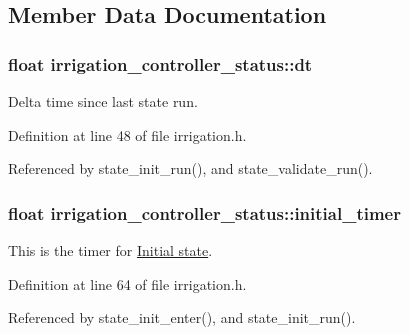 \subsection{Member Data Documentation}
\hypertarget{structirrigation__controller__status_a0a4447a8aa2200bacf97bd7e844493c1}{}
\subsubsection[{dt}]{\setlength{\rightskip}{0pt plus 5cm}float irrigation\+\_\+controller\+\_\+status\+::dt}\label{structirrigation__controller__status_a0a4447a8aa2200bacf97bd7e844493c1}


Delta time since last state run. 



Definition at line 48 of file irrigation.\+h.



Referenced by state\+\_\+init\+\_\+run(), and state\+\_\+validate\+\_\+run().

\hypertarget{structirrigation__controller__status_a9d70c74fe395ec2720089b929a32e1e9}{}
\subsubsection[{initial\+\_\+timer}]{\setlength{\rightskip}{0pt plus 5cm}float irrigation\+\_\+controller\+\_\+status\+::initial\+\_\+timer}\label{structirrigation__controller__status_a9d70c74fe395ec2720089b929a32e1e9}


This is the timer for \hyperlink{group__state__init}{Initial state}. 



Definition at line 64 of file irrigation.\+h.



Referenced by state\+\_\+init\+\_\+enter(), and state\+\_\+init\+\_\+run().

\hypertarget{structirrigation__controller__status_a1ae5ffb12725754d8309452cf24a2a28}{}
